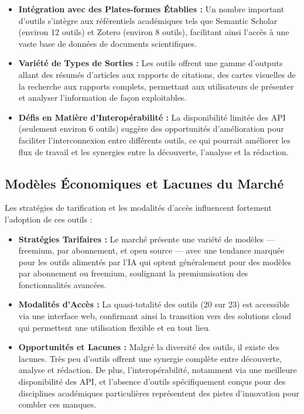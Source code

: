 \documentclass[a4paper,11pt]{report}
\providecommand{\tightlist}{\setlength{\itemsep}{0pt}\setlength{\parskip}{0pt}}
\begin{document}
\begin{itemize}
\tightlist
\item
  \textbf{Intégration avec des Plates-formes Établies :} Un nombre important d'outils s'intègre aux référentiels académiques tels que Semantic Scholar (environ 12 outils) et Zotero (environ 8 outils), facilitant ainsi l'accès à une vaste base de données de documents scientifiques.
\item
  \textbf{Variété de Types de Sorties :} Les outils offrent une gamme d'outputs allant des résumés d'articles aux rapports de citations, des cartes visuelles de la recherche aux rapports complets, permettant aux utilisateurs de présenter et analyser l'information de façon exploitables.
\item
  \textbf{Défis en Matière d'Interopérabilité :} La disponibilité limitée des API (seulement environ 6 outils) suggère des opportunités d'amélioration pour faciliter l'interconnexion entre différents outils, ce qui pourrait améliorer les flux de travail et les synergies entre la découverte, l'analyse et la rédaction.
\end{itemize}

\subsection{Modèles Économiques et Lacunes du Marché}\label{moduxe8les-uxe9conomiques-et-lacunes-du-marchuxe9}

Les stratégies de tarification et les modalités d'accès influencent fortement l'adoption de ces outils :

\begin{itemize}
\tightlist
\item
  \textbf{Stratégies Tarifaires :} Le marché présente une variété de modèles --- freemium, par abonnement, et open source --- avec une tendance marquée pour les outils alimentés par l'IA qui optent généralement pour des modèles par abonnement ou freemium, soulignant la premiumisation des fonctionnalités avancées.
\item
  \textbf{Modalités d'Accès :} La quasi-totalité des outils (20 sur 23) est accessible via une interface web, confirmant ainsi la transition vers des solutions cloud qui permettent une utilisation flexible et en tout lieu.
\item
  \textbf{Opportunités et Lacunes :} Malgré la diversité des outils, il existe des lacunes. Très peu d'outils offrent une synergie complète entre découverte, analyse et rédaction. De plus, l'interopérabilité, notamment via une meilleure disponibilité des API, et l'absence d'outils spécifiquement conçus pour des disciplines académiques particulières représentent des pistes d'innovation pour combler ces manques.
\end{itemize}
\end{document}
